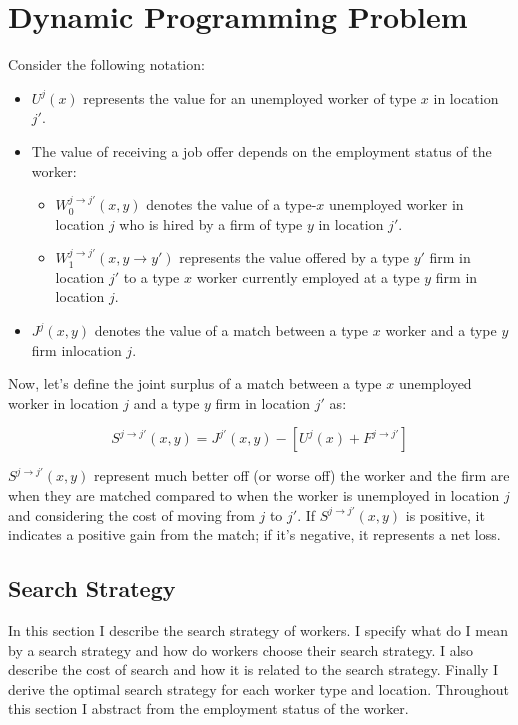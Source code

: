 \documentclass[
  letterpaper,
  DIV=11,
  numbers=noendperiod]{scrreprt}
\providecommand{\tightlist}{%
  \setlength{\itemsep}{0pt}\setlength{\parskip}{0pt}}\usepackage{longtable,booktabs,array}
\begin{document}
\hypertarget{dynamic-programming-problem}{%
\section{Dynamic Programming
Problem}\label{dynamic-programming-problem}}

Consider the following notation:

\begin{itemize}
\tightlist
\item
  \(U^{j}(x)\) represents the value for an unemployed worker of type
  \(x\) in location \(j'\).
\item
  The value of receiving a job offer depends on the employment status of
  the worker:

  \begin{itemize}
  \tightlist
  \item
    \(W^{j\to j'}_{0}(x,y)\) denotes the value of a type-\(x\)
    unemployed worker in location \(j\) who is hired by a firm of type
    \(y\) in location \(j'\).
  \item
    \(W^{j\to j'}_{1}(x,y \to y')\) represents the value offered by a
    type \(y'\) firm in location \(j'\) to a type \(x\) worker currently
    employed at a type \(y\) firm in location \(j\).
  \end{itemize}
\item
  \(J^j(x,y)\) denotes the value of a match between a type \(x\) worker
  and a type \(y\) firm inlocation \(j\).
\end{itemize}

Now, let's define the joint surplus of a match between a type \(x\)
unemployed worker in location \(j\) and a type \(y\) firm in location
\(j'\) as:

\[S^{j\to j'}(x,y) = J^{j'}(x,y) - [U^{j}(x) + F^{j\to j'}]\]

\(S^{j\to j'}(x,y)\) represent much better off (or worse off) the worker
and the firm are when they are matched compared to when the worker is
unemployed in location \(j\) and considering the cost of moving from
\(j\) to \(j'\). If \(S^{j\to j'}(x,y)\) is positive, it indicates a
positive gain from the match; if it's negative, it represents a net
loss.

\hypertarget{search-strategy}{%
\subsection{Search Strategy}\label{search-strategy}}

In this section I describe the search strategy of workers. I specify
what do I mean by a search strategy and how do workers choose their
search strategy. I also describe the cost of search and how it is
related to the search strategy. Finally I derive the optimal search
strategy for each worker type and location. Throughout this section I
abstract from the employment status of the worker.
\end{document}
